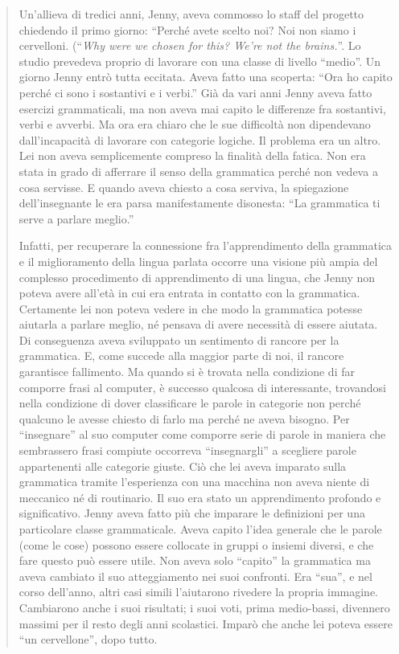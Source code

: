 \begin{quote}
Un'allieva di tredici anni, Jenny, aveva commosso lo staff del progetto chiedendo il primo giorno: “Perché avete scelto noi? Noi non siamo i cervelloni. (“\textit{Why were we chosen for this? We're not the brains.}”. Lo studio prevedeva proprio di lavorare con una classe di livello “medio”. Un giorno Jenny entrò tutta eccitata. Aveva fatto una scoperta: “Ora ho capito perché ci  sono i sostantivi e i verbi.” Già da vari anni Jenny aveva fatto esercizi grammaticali, ma non aveva mai capito le differenze fra sostantivi, verbi e avverbi. Ma ora era chiaro che le sue difficoltà non dipendevano dall'incapacità di lavorare con categorie logiche. Il problema era un altro. Lei non aveva semplicemente compreso la finalità della fatica. Non era stata in grado di afferrare il senso della grammatica perché non vedeva a cosa servisse. E quando aveva chiesto a cosa serviva, la spiegazione dell'insegnante le era parsa manifestamente disonesta: “La grammatica ti serve a parlare meglio.”

Infatti, per recuperare la connessione fra l'apprendimento della grammatica e il miglioramento della lingua parlata occorre una visione più ampia del complesso procedimento di apprendimento di una lingua, che Jenny non poteva avere all'età in cui era entrata in contatto con la grammatica. Certamente lei non poteva vedere in che modo la grammatica potesse aiutarla a parlare meglio, né pensava di avere necessità di essere aiutata. Di conseguenza aveva sviluppato un sentimento di rancore per la grammatica. E, come succede alla maggior parte di noi, il rancore garantisce fallimento. Ma quando si è trovata nella condizione di far comporre frasi al computer, è successo qualcosa di interessante, trovandosi nella condizione di dover classificare le parole in categorie non perché qualcuno le avesse chiesto di farlo ma perché ne aveva bisogno. Per “insegnare” al suo computer come comporre serie di parole in maniera che sembrassero frasi compiute occorreva “insegnargli” a scegliere parole appartenenti alle categorie giuste. Ciò che lei aveva imparato sulla grammatica tramite l'esperienza con una  macchina non aveva niente di meccanico né di routinario. Il suo era stato un apprendimento profondo e significativo. Jenny aveva fatto più che imparare le definizioni per una particolare classe grammaticale. Aveva capito l'idea generale che le parole (come le cose) possono essere collocate in gruppi o insiemi diversi, e che fare questo può essere utile. Non aveva solo “capito” la grammatica ma aveva cambiato il suo atteggiamento nei suoi confronti. Era “sua”, e nel corso dell'anno, altri casi simili l'aiutarono rivedere la propria immagine. Cambiarono anche i suoi risultati; i suoi voti, prima medio-bassi, divennero massimi per il resto degli anni scolastici. Imparò che anche  lei poteva essere “un cervellone”, dopo tutto.
\end{quote}

